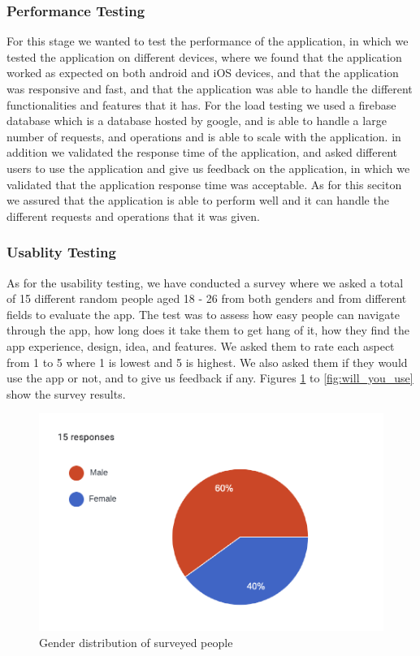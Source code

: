 \documentclass[a4paper, 12pt]{report} %
\begin{document}
        \subsubsection{Performance Testing}
            For this stage we wanted to test the performance of the application, in which we tested the application on different devices, where we found that the application worked as expected on both android and iOS devices, and that the application was responsive and fast, and that the application was able to handle the different functionalities and features that it has.
            For the load testing we used a firebase database which is a database hosted by google, and is able to handle a large number of requests, and operations and is able to scale with the application.
            in addition we validated the response time of the application, and asked different users to use the application and give us feedback on the application, in which we validated that the application response time was acceptable.
            As for this seciton we assured that the application is able to perform well and it can handle the different requests and operations that it was given.

            \subsubsection{Usablity Testing}
                As for the usability testing, we have conducted a survey where we asked a total of 15 different random people aged 18 - 26 from both genders and from different fields to evaluate the app. The test was to assess how easy people can navigate through the app, how long does it take them to get hang of it, how they find the app experience, design, idea, and features. We asked them to rate each aspect from 1 to 5 where 1 is lowest and 5 is highest. We also asked them if they would use the app or not, and to give us feedback if any. 
                Figures \ref{fig:survey_gender} to \ref{fig:will_you_use} show the survey results.

                \begin{figure}[H]
                    \centering
                    \includegraphics[width=\linewidth]{Images/survey_gender.png}
                    \caption{Gender distribution of surveyed people}
                    \label{fig:survey_gender}
                \end{figure}
\end{document}
